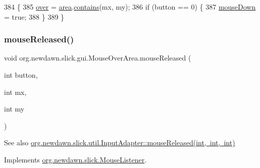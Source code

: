\begin{DoxyCode}
384                                                          \{
385         \mbox{\hyperlink{classorg_1_1newdawn_1_1slick_1_1gui_1_1_mouse_over_area_ac71b080e2b87f755f6e0fb54983877b1}{over}} = \mbox{\hyperlink{classorg_1_1newdawn_1_1slick_1_1gui_1_1_mouse_over_area_a8104ad89fbe457da294da3285b7a3268}{area}}.\mbox{\hyperlink{classorg_1_1newdawn_1_1slick_1_1geom_1_1_shape_ae9dcbe23fb1bcd01bac0ddcfe09685de}{contains}}(mx, my);
386         \textcolor{keywordflow}{if} (button == 0) \{
387             \mbox{\hyperlink{classorg_1_1newdawn_1_1slick_1_1gui_1_1_mouse_over_area_ad1eb1ead0d2c6b907c4b4d4a297da2c0}{mouseDown}} = \textcolor{keyword}{true}; 
388         \}
389     \}
\end{DoxyCode}
\mbox{\label{classorg_1_1newdawn_1_1slick_1_1gui_1_1_mouse_over_area_a7194a272562a8cf50f92b7c60e660132}} 
\subsubsection{\texorpdfstring{mouse\+Released()}{mouseReleased()}}
{\footnotesize\ttfamily void org.\+newdawn.\+slick.\+gui.\+Mouse\+Over\+Area.\+mouse\+Released (\begin{DoxyParamCaption}\item[{int}]{button,  }\item[{int}]{mx,  }\item[{int}]{my }\end{DoxyParamCaption})\hspace{0.3cm}{\ttfamily [inline]}}

\begin{DoxySeeAlso}{See also}
\mbox{\hyperlink{classorg_1_1newdawn_1_1slick_1_1util_1_1_input_adapter_a29e726b1c4d1734882fc38b4c9ecacdb}{org.\+newdawn.\+slick.\+util.\+Input\+Adapter\+::mouse\+Released(int, int, int)}} 
\end{DoxySeeAlso}


Implements \mbox{\hyperlink{interfaceorg_1_1newdawn_1_1slick_1_1_mouse_listener_a8d1606869f610664f9299565067d5571}{org.\+newdawn.\+slick.\+Mouse\+Listener}}.


